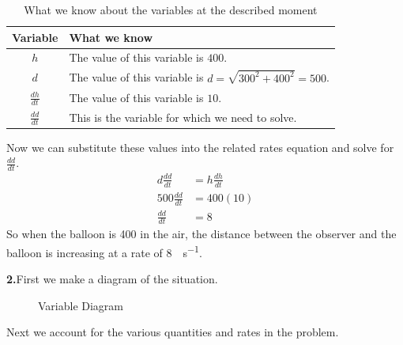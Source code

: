 \documentclass[10pt,oneside,]{book}
\theoremstyle{plain}
\theoremstyle{definition}
\numberwithin{equation}{section}
\newcommand{\lz}[2]{\frac{d#1}{d#2}}
\begin{document}
\begin{table}
\centering
\caption{What we know about the variables at the described moment\label{table-38}}
\begin{tabular}{cp{4in}}
\toprule
Variable&What we know\\
\midrule
\(h\)&The value of this variable is \(400\).\\
\midrule
\(d\)&The value of this variable is \(d=\sqrt{300^2+400^2}=500\).\\
\midrule
\(\lz{h}{t}\)&The value of this variable is \(10\).\\
\midrule
\(\lz{d}{t}\)&This is the variable for which we need to solve.\\
\bottomrule
\end{tabular}
\end{table}
\par
Now we can substitute these values into the related rates equation and solve for \(\lz{d}{t}\).\begin{align*}
d\lz{d}{t}&=h\lz{h}{t}\\
500\lz{d}{t}&=400(10)\\
\lz{d}{t}&=8
\end{align*}So when the balloon is \SI{400}{\foot} in the air, the distance between the observer and the balloon is increasing at a rate of \SI{8}{\foot\per\second}.%
\par\smallskip
\noindent\textbf{2.}\quad{}First we make a diagram of the situation.%
\begin{figure}
\centering
{
}
\caption{Variable Diagram\label{figure-88}}
\end{figure}
\par
Next we account for the various quantities and rates in the problem.%
\end{document}
